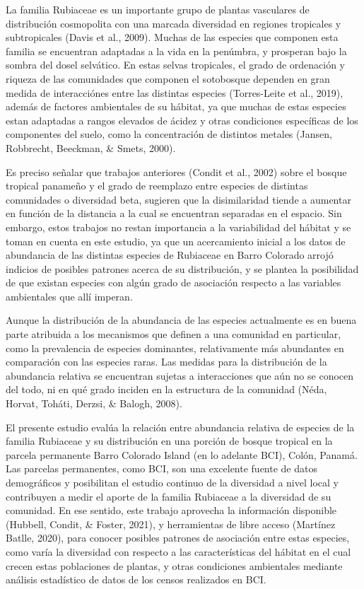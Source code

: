 \documentclass[11pt,]{article}
\begin{document}
La familia Rubiaceae es un importante grupo de plantas vasculares de
distribución cosmopolita con una marcada diversidad en regiones
tropicales y subtropicales (Davis et al., 2009). Muchas de las especies
que componen esta familia se encuentran adaptadas a la vida en la
penúmbra, y prosperan bajo la sombra del dosel selvático. En estas
selvas tropicales, el grado de ordenación y riqueza de las comunidades
que componen el sotobosque dependen en gran medida de interacciónes
entre las distintas especies (Torres-Leite et al., 2019), además de
factores ambientales de su hábitat, ya que muchas de estas especies
estan adaptadas a rangos elevados de ácidez y otras condiciones
específicas de los componentes del suelo, como la concentración de
distintos metales (Jansen, Robbrecht, Beeckman, \& Smets, 2000).

Es preciso señalar que trabajos anteriores (Condit et al., 2002) sobre
el bosque tropical panameño y el grado de reemplazo entre especies de
distintas comunidades o diversidad beta, sugieren que la disimilaridad
tiende a aumentar en función de la distancia a la cual se encuentran
separadas en el espacio. Sin embargo, estos trabajos no restan
importancia a la variabilidad del hábitat y se toman en cuenta en este
estudio, ya que un acercamiento inicial a los datos de abundancia de las
distintas especies de Rubiaceae en Barro Colorado arrojó indicios de
posibles patrones acerca de su distribución, y se plantea la posibilidad
de que existan especies con algún grado de asociación respecto a las
variables ambientales que allí imperan.

Aunque la distribución de la abundancia de las especies actualmente es
en buena parte atribuida a los mecanismos que definen a una comunidad en
particular, como la prevalencia de especies dominantes, relativamente
más abundantes en comparación con las especies raras. Las medidas para
la distribución de la abundancia relativa se encuentran sujetas a
interacciones que aún no se conocen del todo, ni en qué grado inciden en
la estructura de la comunidad (Néda, Horvat, Toháti, Derzsi, \& Balogh,
2008).

El presente estudio evalúa la relación entre abundancia relativa de
especies de la familia Rubiaceae y su distribución en una porción de
bosque tropical en la parcela permanente Barro Colorado Island (en lo
adelante BCI), Colón, Panamá. Las parcelas permanentes, como BCI, son
una excelente fuente de datos demográficos y posibilitan el estudio
continuo de la diversidad a nivel local y contribuyen a medir el aporte
de la familia Rubiaceae a la diversidad de su comunidad. En ese sentido,
este trabajo aprovecha la información disponible (Hubbell, Condit, \&
Foster, 2021), y herramientas de libre acceso (Martínez Batlle, 2020),
para conocer posibles patrones de asociación entre estas especies, como
varía la diversidad con respecto a las características del hábitat en el
cual crecen estas poblaciones de plantas, y otras condiciones
ambientales mediante análisis estadístico de datos de los censos
realizados en BCI.
\end{document}
